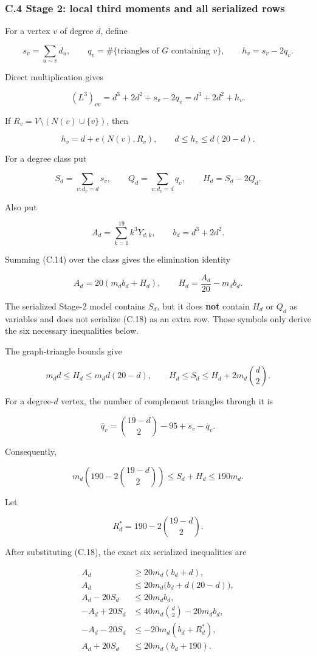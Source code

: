 \documentclass[
  english,
  11pt,
  a4paper,
]{article}
\begin{document}
\subsubsection{C.4 Stage 2: local third moments and all serialized
rows}\label{c.4-stage-2-local-third-moments-and-all-serialized-rows}

For a vertex \(v\) of degree \(d\), define

\[
s_v=\sum_{u\sim v}d_u,\qquad
q_v=\#\{\text{triangles of }G\text{ containing }v\},\qquad
h_v=s_v-2q_v.
\tag{C.13}
\]

Direct multiplication gives

\[
(L^3)_{vv}=d^3+2d^2+s_v-2q_v=d^3+2d^2+h_v.
\tag{C.14}
\]

If \(R_v=V\setminus(N(v)\cup\{v\})\), then

\[
h_v=d+e(N(v),R_v),\qquad
d\le h_v\le d(20-d).
\tag{C.15}
\]

For a degree class put

\[
S_d=\sum_{v:d_v=d}s_v,\qquad
Q_d=\sum_{v:d_v=d}q_v,\qquad
H_d=S_d-2Q_d.
\tag{C.16}
\]

Also put

\[
A_d=\sum_{k=1}^{19}k^3Y_{d,k},\qquad
b_d=d^3+2d^2.
\tag{C.17}
\]

Summing (C.14) over the class gives the elimination identity

\[
A_d=20(m_db_d+H_d),\qquad
H_d=\frac{A_d}{20}-m_db_d.
\tag{C.18}
\]

The serialized Stage-2 model contains \(S_d\), but it does \textbf{not}
contain \(H_d\) or \(Q_d\) as variables and does not serialize (C.18) as
an extra row. Those symbols only derive the six necessary inequalities
below.

The graph-triangle bounds give

\[
m_dd\le H_d\le m_dd(20-d),\qquad
H_d\le S_d\le H_d+2m_d\binom d2.
\tag{C.19}
\]

For a degree-\(d\) vertex, the number of complement triangles through it
is

\[
\overline q_v=\binom{19-d}{2}-95+s_v-q_v.
\tag{C.20}
\]

Consequently,

\[
m_d\left(190-2\binom{19-d}{2}\right)
\le S_d+H_d\le190m_d.
\tag{C.21}
\]

Let

\[
R_d^*=190-2\binom{19-d}{2}.
\]

After substituting (C.18), the exact six serialized inequalities are

\[
\begin{aligned}
A_d &\ge20m_d(b_d+d),\\
A_d &\le20m_d\bigl(b_d+d(20-d)\bigr),\\
A_d-20S_d &\le20m_db_d,\\
-A_d+20S_d &\le40m_d\binom d2-20m_db_d,\\
-A_d-20S_d &\le-20m_d(b_d+R_d^*),\\
A_d+20S_d &\le20m_d(b_d+190).
\end{aligned}
\tag{C.22}
\]
\end{document}
